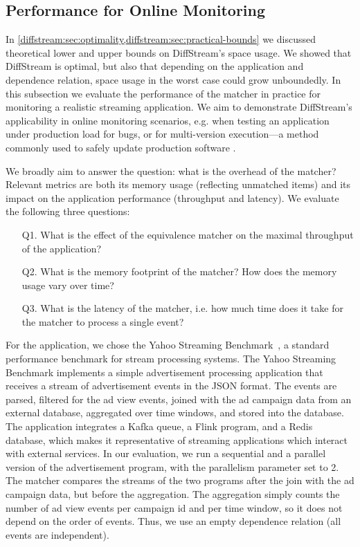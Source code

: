 \subsection{Performance for Online Monitoring}
\label{diffstream:ssec:evaluation-onlinemonitoring}

In \cref{diffstream:sec:optimality,diffstream:sec:practical-bounds} we discussed theoretical lower
and upper bounds on DiffStream's space usage. We showed that DiffStream is
optimal, but also that depending on the application and dependence relation, space usage in the worst case could grow unboundedly. In this subsection we
evaluate the performance of the matcher in practice for monitoring a realistic streaming application.
We aim to demonstrate DiffStream's applicability in online monitoring scenarios,
e.g. when testing an application under production load for bugs,
or for multi-version execution---a method commonly used to safely update
production software
\cite{tucek2009delta-execution,hosek2013safe,maurer2012tachyon}.

We broadly aim to answer the question: what is the overhead of the matcher?
Relevant metrics are both its memory usage (reflecting unmatched items) and its impact on the application performance (throughput and latency). We evaluate the following three questions:
\begin{enumerate}
  \item[Q1.] What is the effect of the equivalence matcher on the maximal
  throughput of the application?
  \item[Q2.] What is the memory footprint of the matcher? How does the memory usage vary over time?
  \item[Q3.] What is the latency of the matcher, i.e. how much time does
  it take for the matcher to process a single event?
\end{enumerate}

For the application, we chose the Yahoo Streaming
Benchmark~\cite{yahoostreaming2016}, a standard performance benchmark for stream processing systems.
The Yahoo
Streaming Benchmark implements a simple advertisement processing application
that receives a stream of advertisement events in the JSON format. The events
are parsed, filtered for the ad view events, joined with the ad campaign data
from an external database, aggregated over time windows, and stored into the
database. The application integrates a Kafka queue, a Flink program, and a
Redis database,
which makes it representative of streaming applications which interact with external services.
In our evaluation, we run a sequential and a parallel version of the
advertisement program, with the parallelism parameter set to 2. The
matcher compares the streams of the two programs
after the join with the ad campaign data,
but before the aggregation. The aggregation simply counts the number of
ad view events per campaign id and per time window, so it does not depend on
the order of events. Thus, we use an empty dependence relation (all events
are independent).

